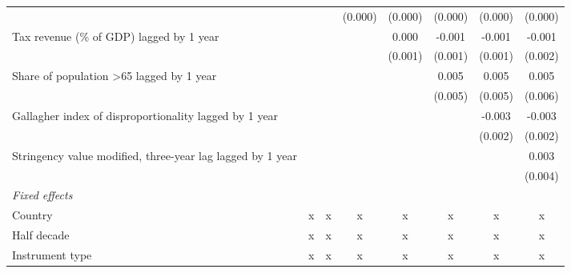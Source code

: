 \begin{tabular}{lccccccc}
                                                                                         &              &              & (0.000)      & (0.000) & (0.000) & (0.000) & (0.000)\\   
   Tax revenue (\% of GDP) lagged by 1 year                                              &              &              &              & 0.000   & -0.001  & -0.001  & -0.001\\   
                                                                                         &              &              &              & (0.001) & (0.001) & (0.001) & (0.002)\\   
   Share of population >65 lagged by 1 year                                              &              &              &              &         & 0.005   & 0.005   & 0.005\\   
                                                                                         &              &              &              &         & (0.005) & (0.005) & (0.006)\\   
   Gallagher index of disproportionality lagged by 1 year                                &              &              &              &         &         & -0.003  & -0.003\\   
                                                                                         &              &              &              &         &         & (0.002) & (0.002)\\   
   Stringency value modified, three-year lag lagged by 1 year                            &              &              &              &         &         &         & 0.003\\   
                                                                                         &              &              &              &         &         &         & (0.004)\\   
   \emph{Fixed effects}\\
   Country                                                                               & x            & x            & x            & x       & x       & x       & x\\  
   Half decade                                                                           & x            & x            & x            & x       & x       & x       & x\\  
   Instrument type                                                                       & x            & x            & x            & x       & x       & x       & x\\  

\end{tabular}
